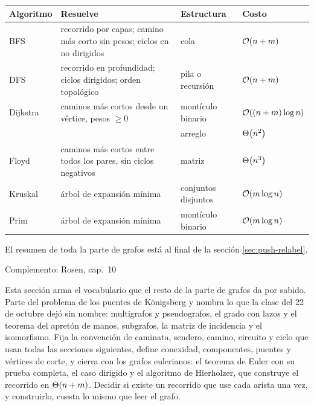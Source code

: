 \documentclass[11pt,letterpaper]{article}
\begin{document}
\begin{center}
\small
\begin{tabular}{l>{\raggedright\arraybackslash}p{4.4cm}%
                 >{\raggedright\arraybackslash}p{3.2cm}l}
  \toprule
  \textbf{Algoritmo} & \textbf{Resuelve} & \textbf{Estructura}
    & \textbf{Costo} \\
  \midrule
  BFS & recorrido por capas; camino más corto sin pesos; ciclos en no
        dirigidos & cola & $\mathcal{O}\!\left(n + m\right)$ \\
  \addlinespace
  DFS & recorrido en profundidad; ciclos dirigidos; orden topológico
      & pila o recursión & $\mathcal{O}\!\left(n + m\right)$ \\
  \addlinespace
  Dijkstra & caminos más cortos desde un vértice, pesos $\geq 0$
           & montículo binario & $\mathcal{O}\!\left((n + m) \log n\right)$ \\
           & & arreglo & $\Theta\!\left(n^2\right)$ \\
  \addlinespace
  Floyd & caminos más cortos entre todos los pares, sin ciclos
          negativos & matriz & $\Theta\!\left(n^3\right)$ \\
  \addlinespace
  Kruskal & árbol de expansión mínima & conjuntos disjuntos
          & $\mathcal{O}\!\left(m \log n\right)$ \\
  \addlinespace
  Prim & árbol de expansión mínima & montículo binario
       & $\mathcal{O}\!\left(m \log n\right)$ \\
  \bottomrule
\end{tabular}
\end{center}

El resumen de toda la parte de grafos está al final de la
sección \ref{sec:push-relabel}.

\newpage


%
  {Complemento: Rosen, cap.\ 10}
\label{sec:teoria-grafos}

\begin{quick_sum}
  Esta sección arma el vocabulario que el resto de la parte de grafos
  da por sabido. Parte del problema de los puentes de Königsberg y
  nombra lo que la clase del 22 de octubre dejó sin nombre:
  multigrafos y pseudografos, el grado con lazos y el teorema del
  apretón de manos, subgrafos, la matriz de incidencia y el
  isomorfismo. Fija la convención de caminata, sendero, camino,
  circuito y ciclo que usan todas las secciones siguientes, define
  conexidad, componentes, puentes y vértices de corte, y cierra con
  los grafos eulerianos: el teorema de Euler con su prueba completa,
  el caso dirigido y el algoritmo de Hierholzer, que construye el
  recorrido en $\Theta\!\left(n + m\right)$. Decidir si existe un recorrido que use
  cada arista una vez, y construirlo, cuesta lo mismo que leer el
  grafo.
\end{quick_sum}
\end{document}
